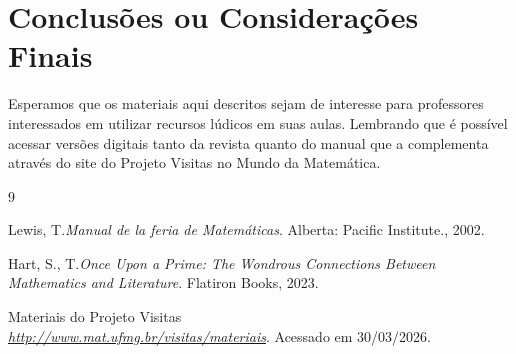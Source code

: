 \documentclass[12pt,oneside,a4paper]{article}
\begin{document}
\section{Conclus\~oes ou Considerações Finais} %

Esperamos que os materiais aqui descritos sejam de interesse para professores interessados em utilizar recursos lúdicos em suas aulas. Lembrando que é possível acessar versões digitais tanto da revista quanto do manual que a complementa através do site do Projeto Visitas no Mundo da Matemática.


\renewcommand{\refname}{Bibliografia}
  \begin{thebibliography}{9}


      Lewis, T.\emph{Manual de la feria de Matemáticas}.   Alberta: Pacific Institute., 2002.

       Hart, S., T.\emph{Once Upon a Prime: The Wondrous Connections Between Mathematics and Literature}.   Flatiron Books, 2023.

      Materiais do Projeto Visitas\\ \emph{\url{http://www.mat.ufmg.br/visitas/materiais}}. Acessado em 30/03/2026.

 
\end{thebibliography}
\end{document}
